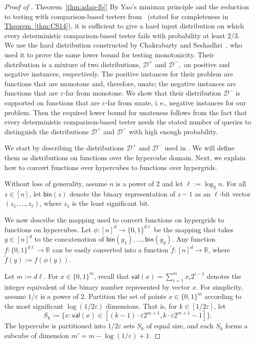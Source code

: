 \documentclass[11pt]{article}
\numberwithin{equation}{section}
\theoremstyle{definition}
\theoremstyle{plain}
\newcommand{\R}{\mathbb R}
\newcommand{\ie}{i.\,e.}
\newcommand{\expref}[2]{\hyperref[#2]{#1~\ref{#2}}}
\newcommand{\eps}{\varepsilon}
\newcommand{\Yes}{\ensuremath{\mathcal{D}^+}}
\newcommand{\No}{\ensuremath{\mathcal{D}^-}}
\newcommand{\dec}{\mathsf{val}}
\newcommand{\bin}{\mathsf{bin}}
\newcommand{\Thm}[1]{\expref{Theorem}{thm:#1}}
\begin{document}
\begin{proof}[Proof of \Thm{adap-lb}]
  By Yao's minimax principle and the reduction to testing with comparison-based testers from~\cite{Fis04,CS14} (stated for completeness in \Thm{CS14}), it is sufficient to give a hard input distribution on which every deterministic comparison-based tester fails with probability at least $2/3$. We use the hard distribution constructed  by Chakrabarty and Seshadhri~\cite{CS14}, who used it to prove the same lower bound for testing monotonicity. Their distribution is a mixture of two distributions, $\Yes$ and $\No,$ on positive and negative instances, respectively.
%
%
%
The positive %
instances for their problem are
%
%
%
%
functions that are monotone and, therefore, unate;
the %
negative instances are
%
%
functions that are $\eps$-far from monotone. We show that their 
%
%
distribution $\No$
%
is supported on functions that are $\eps$-far from unate, \ie, negative instances for our problem. Then the required lower bound for unateness follows from the fact that every deterministic comparison-based tester needs the stated number of queries to distinguish
the  %
%
%
distributions $\Yes$ and $\No$
%
with high enough probability.

We start by describing 
%
%
the distributions $\Yes$ and $\No$
%
used in \cite{CS14}. We will define them as distributions on functions over the hypercube domain. Next, we explain how to convert functions over hypercubes  to functions over hypergrids.

Without loss of generality, assume $n$ is a power of $2$ and let $\ell := \log_2 n$.
%
For all $z \in [n]$, let $\bin(z)$ denote the binary representation of $z-1$ as an $\ell$-bit vector $(z_1, \ldots, z_\ell)$, where $z_1$ is the least significant bit.

We now describe the mapping used to convert functions on hypergrids to functions on hypercubes. Let $\phi:[n]^d \to \{0,1\}^{d\ell}$ be the mapping that takes $y\in[n]^d$ to the concatenation of $\bin(y_1),\dots,\bin(y_d)$. Any function $f:\{0,1\}^{d \ell} \to \R$ can be easily converted into a function $\widetilde{f}:[n]^d \to \R$, where $\widetilde{f}(y) := f(\phi(y))$.

Let $m:= d\ell$. For $x \in \{0,1\}^m$, recall that $\dec(x) = \sum\nolimits_{i=1}^m x_i 2^{i-1}$ denotes the integer equivalent of the binary number represented by vector $x$. For simplicity, assume $1/\eps$ is a power of $2$.
Partition the set of points $x \in \{0,1\}^m$ according to the most significant $\log(1/2\eps)$ dimensions.
That is, for $k \in [1/2\eps]$, let
\[S_k := \{x: \dec(x) \in [(k-1)\cdot \eps 2^{m+1}, k\cdot\eps 2^{m+1} - 1]\}.\]
The hypercube is partitioned into $1/2\eps$ sets $S_k$ of equal size, and each $S_k$ forms a subcube of dimension $m' = m - \log(1/\eps) + 1$.


\end{proof}
\end{document}
